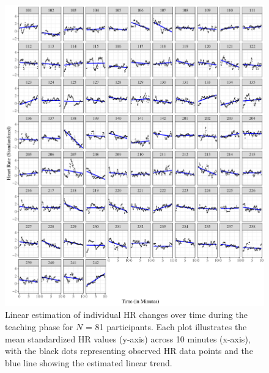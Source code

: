 \documentclass[preprint,
3p]{elsarticle} %
\begin{document}
\begin{figure}[htbp]
  \centering
  \includegraphics[width=1\textwidth]{plots_publication/plot_teaching_appendix.pdf}
  \caption{Linear estimation of individual HR changes over time during the teaching phase for $N$ = 81 participants. Each plot illustrates the mean standardized HR values (y-axis) across 10 minutes (x-axis), with the black dots representing observed HR data points and the blue line showing the estimated linear trend.}
  \label{fig.a4}
\end{figure}
\end{document}
